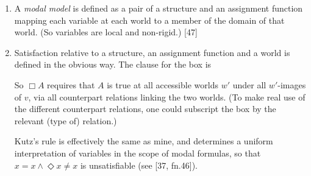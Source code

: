 \documentclass[11pt]{woarticle}
\theoremstyle{break}
\theoremstyle{nonumberplain}
\newcommand{\SAT}{\Vdash}
\newcommand{\1}{\;\,|\;\,}
\begin{document}
{\begin{enumerate}
  The fact that structures include a \emph{set} of counterpart
  relations, each defined only for a given pair of domains, means that
  e.g.\ $x$ at $w$ can be its own counterpart at $w$, but not at $w'$,
  because $\Fr{C}$ contains the identity relation on $U_w$ as well as
  some other relation between $U_w$ and $U_{w'}$. (Kutz explicitly
  allows for numerical identity across worlds [37, fn.47].) OTOH, if
  $U_{w'} = U_{w''}$, then it looks like individuals at $w$ cannot
  have different counterparts at $w'$ than at $w''$. My models allow
  for this by having the relations in $\Fr{C}$ tagged by the relevant
  structures (e.g., $w$ and $w'$). It might be worth checking if this
  creates problems in Kutz's completeness proofs.

  There can be several counterpart relations between two given
  structures. As \cite[11]{kracht02semantics} remark, ``this feature
  is not eliminable and actually one of the basic ingredients of all
  generalizations of standard Kripke-semantics. This is underlined by
  the fact that one can easily construct second-order closed modal
  predicate logics that are frame-complete only with respect to frames
  having at least two counterpart-relations between any two worlds''.

\item A \emph{modal model} is defined as a pair of a structure and an
  assignment function mapping each variable at each world to a member
  of the domain of that world. (So variables are local and non-rigid.)
  [47]

\item Satisfaction relative to a structure, an assignment function and
  a world is defined in the obvious way. The clause for the box is
  So $\Box A$ requires that $A$ is true at all accessible worlds $w'$
  under all $w'$-images of $v$, via all counterpart relations linking
  the two worlds. (To make real use of the different counterpart
  relations, one could subscript the box by the relevant (type of)
  relation.) 

  Kutz's rule is effectively the same as mine, and determines a
  uniform interpretation of variables in the scope of modal formulas,
  so that $x\!=\!x \land \Diamond x\!\not=\!x$ is unsatisfiable (see [37,
  fn.46]).


\end{enumerate}}
\end{document}
